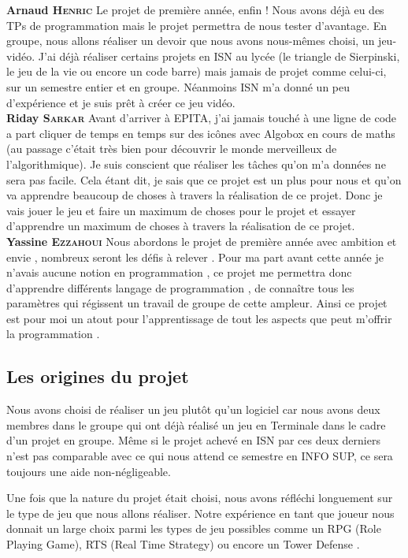 \documentclass[a4paper, 12pt]{article}
\begin{document}
	\parindent=0cm\textbf{Arnaud \textsc{Henric}}
	\smallbreak
	Le projet de première année, enfin ! Nous avons déjà eu des TPs de programmation mais le projet permettra de nous tester d’avantage. En groupe, nous allons réaliser un devoir que nous avons nous-mêmes choisi, un jeu-vidéo. J’ai déjà réaliser certains projets en ISN au lycée (le triangle de Sierpinski, le jeu de la vie ou encore un code barre) mais jamais de projet comme celui-ci, sur un semestre entier et en groupe. Néanmoins ISN m’a donné un peu d'expérience et je suis prêt à créer ce jeu vidéo.\\
	
	\parindent=0cm\textbf{Riday \textsc{Sarkar}}
	\smallbreak
 Avant d’arriver à EPITA,  j'ai jamais touché à une ligne de code a part cliquer de temps en temps sur des icônes avec Algobox en cours de maths (au passage c'était très bien pour découvrir  le monde merveilleux de l’algorithmique). Je suis conscient que réaliser les tâches qu’on m’a données ne sera pas facile. Cela étant dit, je sais que ce projet est un plus pour nous et qu’on va apprendre beaucoup de choses à travers la réalisation de ce projet. Donc je vais jouer le jeu et faire un maximum de choses pour le projet et essayer d’apprendre un maximum de choses à travers la réalisation de ce projet.\\

	\parindent=0cm\textbf{Yassine \textsc{Ezzahoui}}
	\smallbreak
	Nous abordons  le projet de première année avec ambition et envie , nombreux seront les défis à relever . Pour ma part avant cette année je n’avais aucune notion en programmation , ce projet me permettra donc d’apprendre différents langage de programmation ,  de connaître tous les paramètres qui régissent un travail de groupe de cette ampleur. Ainsi ce  projet est pour moi  un atout pour l’apprentissage de tout les aspects que peut m’offrir la programmation .

	\parindent=0.5cm 
	\subsection{Les origines du projet}
Nous avons choisi de réaliser un jeu plutôt qu’un logiciel car nous avons deux membres dans le groupe qui ont déjà réalisé un jeu en Terminale dans le cadre d’un projet en groupe. Même si le projet achevé en ISN par ces deux derniers n’est pas comparable avec ce qui nous attend ce semestre en INFO SUP, ce sera toujours une aide non-négligeable.
\par Une fois que la nature du projet était choisi, nous avons réfléchi longuement sur le type de jeu que nous allons réaliser. Notre expérience en tant que joueur nous donnait un large choix parmi les types de jeu possibles comme un RPG (Role Playing Game), RTS (Real Time Strategy) ou encore un Tower Defense . 
\end{document}
